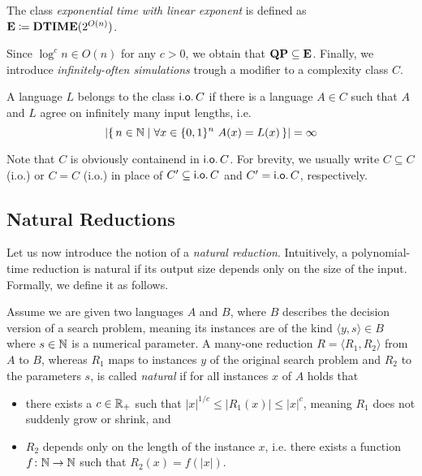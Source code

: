 \documentclass[11pt]{article}
\begin{document}
\begin{definition}
  The class \emph{exponential time with linear exponent} is defined as
	$\mathbf{E} \coloneqq \mathbf{DTIME}(2^{O(n)})$.
\end{definition}
Since $\log^c n \in O(n)$ for any $c > 0$, we obtain that
$\mathbf{QP} \subseteq \mathbf{E}$.
%
Finally, we introduce \emph{infinitely-often simulations} trough a modifier to
a complexity class $C$.
\begin{definition}
  A language $L$ belongs to the class
  $\mathsf{i.o.}\, C$ if there is a language $A \in C$ such that
  $A$ and $L$ agree on infinitely many input lengths, i.e.
  \[
    |\set{ n \in \N \mid \forall x \in \{0,1\}^n\ A(x) = L(x) }| = \infty
  \]
\end{definition}
Note that $C$ is obviously containend in $\mathsf{i.o.}\, C$.
For brevity, we usually write $C \subseteq C$ (i.o.) or $C = C$ (i.o.)
in place of $C' \subseteq \mathsf{i.o.}\, C$ and $C' = \mathsf{i.o.}\, C$, respectively.



\subsection{Natural Reductions}

Let us now introduce the notion of a \textit{natural reduction}.
Intuitively, a polynomial-time reduction is natural if its output size
depends only on the size of the input. Formally, we define it as follows.

\begin{definition}
  Assume we are given two languages $A$ and $B$, where $B$ describes the
  decision version of a search problem, meaning its instances are of the kind
  $\langle y, s \rangle \in B$ where $s \in {\mathbb{N}}$ is a numerical parameter.
  A many-one reduction $R = \langle R_1, R_2 \rangle$ from $A$ to $B$, whereas
  $R_1$ maps to instances $y$ of the original search problem and $R_2$ to the
  parameters $s$, is called \emph{natural} if for all instances $x$ of $A$ holds
  that
  \begin{itemize}
    \item there exists a $c \in {\mathbb R}_+$ such that
      $|x|^{1/c} \le |R_1(x)| \le |x|^c$, meaning $R_1$ does not suddenly grow or
      shrink, and
    \item $R_2$ depends only on the length of the instance $x$, i.e. there
      exists a function $f \colon {\mathbb{N}} \to {\mathbb{N}}$ such that $R_2(x) = f(|x|)$.
  \end{itemize}
\end{definition}
	
\end{document}
